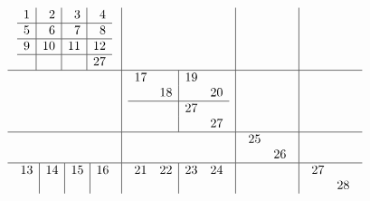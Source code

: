 \documentclass[12pt,a4paper]{amsart}
\begin{document}
\begin{align*}
  \begin{array}{c|c|c|c}
\begin{array}{r|r|r|r}%
1&2&3&4\\\hline%
5&6&7&8\\\hline%
9&10&11&12\\\hline%
  &  &  &27\\%
\end{array}
&&&\\\hline
&
\begin{array}{rr|rr}%
17&  &19&  \\%
  &18&  &20\\\hline%
  &  &27&  \\%
  &  &  &27\\%
\end{array}
&&\\\hline
&&
\begin{array}{rr}%
25&  \\%
  &26\\%
\end{array}
&\\\hline
\begin{array}{r|r|r|r}%
13&14&15&16\\%
  &  &  &  \\%
\end{array}
&
\begin{array}{rr|rr}%
21&22&23&24\\%
  &  &  &  \\%
\end{array}
&&
\begin{array}{rr}%
27&  \\%
  &28\\%
\end{array}
\\
\end{array}
\end{align*}
\end{document}
